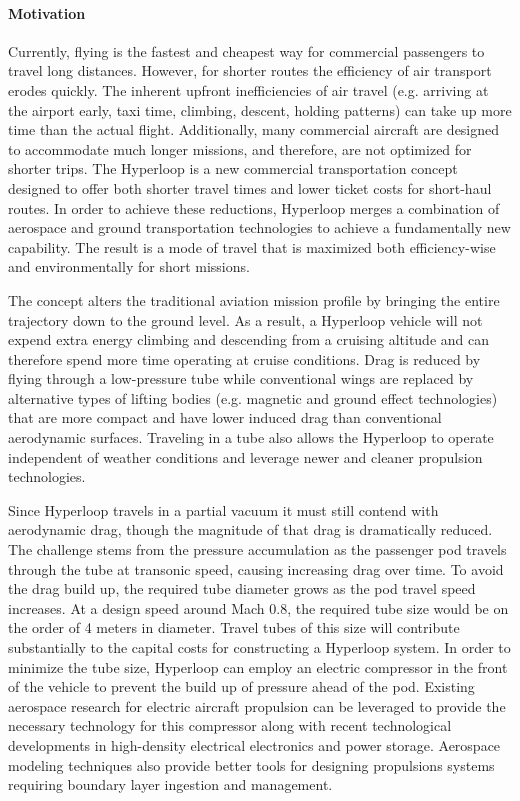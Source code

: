 \paragraph{Motivation}

    Currently, flying is the fastest and cheapest way for commercial
    passengers to travel long distances. However, for shorter routes the
    efficiency of air transport erodes quickly.
    The inherent upfront inefficiencies of air travel (e.g. arriving at the
    airport early, taxi time, climbing, descent, holding patterns)
    can take up more time than the actual flight.
    Additionally, many commercial aircraft are designed to accommodate much longer
    missions, and therefore, are not optimized for shorter trips.
    The Hyperloop is a new commercial transportation concept designed to offer
    both shorter travel times and lower ticket costs for short-haul routes.
    In order to achieve these reductions, Hyperloop merges a
    combination of aerospace and ground transportation technologies to achieve
    a fundamentally new capability. The result is a mode of travel that is
    maximized both efficiency-wise and environmentally for short missions.

    The concept alters the traditional aviation mission profile by bringing
    the entire trajectory down to the ground level.
    As a result, a Hyperloop vehicle will not expend extra energy climbing
    and descending from a cruising altitude and can therefore spend more time
    operating at cruise conditions.
    Drag is reduced by flying through a low-pressure tube
    while conventional wings are replaced by alternative types of lifting bodies
    (e.g. magnetic and ground effect technologies) that are more compact and
    have lower induced drag than conventional aerodynamic surfaces.
    Traveling in a tube also allows the Hyperloop to operate independent of
    weather conditions and leverage newer and cleaner propulsion technologies.

    Since Hyperloop travels in a partial vacuum it must still contend with
    aerodynamic drag, though the magnitude of that drag is dramatically
    reduced. The challenge stems from the pressure accumulation as the passenger pod
    travels through the tube at transonic speed, causing increasing drag over time.
    To avoid the drag build up, the required tube diameter grows as the pod
    travel speed increases. At a design speed around Mach 0.8, the required tube
    size would be on the order of 4 meters in diameter. \cite{Chin}
    Travel tubes of this size will contribute
    substantially to the capital costs for constructing a Hyperloop system.
    In order to minimize the tube size, Hyperloop can employ an electric
    compressor in the front of the vehicle to prevent the build up
    of pressure ahead of the pod. Existing aerospace research for
    electric aircraft propulsion can be leveraged to provide the necessary
    technology for this compressor along with recent technological developments
    in high-density electrical electronics and power storage. Aerospace modeling
    techniques also provide better tools for designing propulsions systems
    requiring boundary layer ingestion and management.

